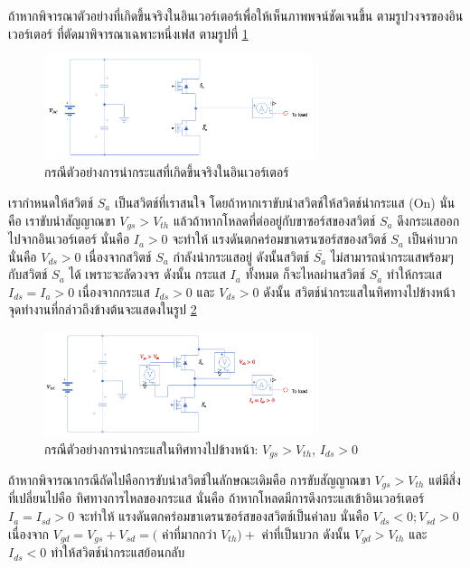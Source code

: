 \documentclass[11pt,a4paper]{article}
\begin{document}
ถ้าหากพิจารณาตัวอย่างที่เกิดขึ้นจริงในอินเวอร์เตอร์เพื่อให้เห็นภาพพจน์ชัดเจนขึ้น ตามรูปวงจรของอินเวอร์เตอร์ ที่ตัดมาพิจารณาเฉพาะหนึ่งเฟส ตามรูปที่ \ref{inverter1p}

\begin{figure}[h!]
    \centering
    \includegraphics[width=0.7\textwidth]{first_third_inverter.png}
    \caption{กรณีตัวอย่างการนำกระแสที่เกิดขึ้นจริงในอินเวอร์เตอร์}
    \label{inverter1p}
\end{figure}

เรากำหนดให้สวิตช์ $S_a$ เป็นสวิตช์ที่เราสนใจ โดยถ้าหากเราขับนำสวิตช์ให้สวิตช์นำกระแส (On) นั่นคือ เราขับนำสัญญาณขา $V_{gs} > V_{th}$ แล้วถ้าหากโหลดที่ต่ออยู่กับขาซอร์สของสวิตช์ $S_a$ ดึงกระแสออกไปจากอินเวอร์เตอร์ นั่นคือ $I_a > 0$ จะทำให้ แรงดันตกคร่อมขาเดรนซอร์สของสวิตช์ $S_a$ เป็นค่าบวก นั่นคือ $V_{ds} > 0$ เนื่องจากสวิตช์ $S_a$ กำลังนำกระแสอยู่ ดังนั้นสวิตช์ $\bar{S_a}$ ไม่สามารถนำกระแสพร้อมๆ กับสวิตช์ $S_a$ ได้ เพราะจะลัดวงจร ดังนั้น กระแส $I_a$ ทั้งหมด ก็จะไหลผ่านสวิตช์ $S_a$ ทำให้กระแส $I_{ds} = I_a > 0$ เนื่องจากกระแส $I_{ds} > 0$ และ $V_{ds} > 0$ ดังนั้น สวิตช์นํากระแสในทิศทางไปข้างหน้า จุดทำงานที่กล่าวถึงข้างต้นจะแสดงในรูป \ref{inverter_q1}

\begin{figure}[h!]
    \centering
    \includegraphics[width=0.7\textwidth]{inverter_q1.png}
    \caption{กรณีตัวอย่างการนำกระแสในทิศทางไปข้างหน้า: $V_{gs} > V_{th}$, $I_{ds} > 0$}
    \label{inverter_q1}
\end{figure}

ถ้าหากพิจารณากรณีถัดไปคือการขับนำสวิตช์ในลักษณะเดิมคือ การขับสัญญาณขา $V_{gs} > V_{th}$ แต่มีสิ่งที่เปลี่ยนไปคือ ทิศทางการไหลของกระแส นั่นคือ ถ้าหากโหลดมีการดึงกระแสเข้าอินเวอร์เตอร์ $I_a = I_{sd} >0$ จะทำให้ แรงดันตกคร่อมขาเดรนซอร์สของสวิตช์เป็นค่าลบ นั่นคือ $V_{ds} <0; V_{sd} > 0$ เนื่องจาก $V_{gd} = V_{gs} + V_{sd} =($ ค่าที่มากกว่า $V_{th})+$ ค่าที่เป็นบวก ดังนั้น $V_{gd} > V_{th}$ และ $I_{ds} < 0$ ทำให้สวิตช์นำกระแสย้อนกลับ
\end{document}
